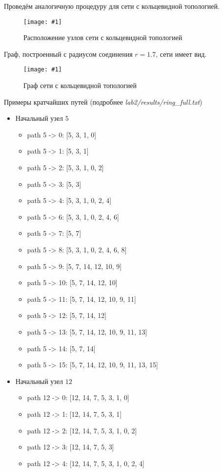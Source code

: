 \documentclass[a4paper,12pt]{article}
\newcommand{\plot}[3]{
    \begin{figure}[H]
        \begin{center}
            \texttt{[image: \#1]}
            \caption{#2}
            \label{#3}
        \end{center}
    \end{figure}
}
\begin{document}
    Проведём аналогичную процедуру для сети с кольцевидной топологией.
    \plot{full_ring_points}{Расположение узлов сети с кольцевидной топологией}{p:fullRingPoints}

    Граф, построенный с радиусом соединения $ r = 1.7 $, сети имеет вид.
    \plot{full_ring}{Граф сети с кольцевидной топологией}{p:fullRing}

    Примеры кратчайших путей (подробнее \textsl{lab2/results/ring\_full.txt})
    \begin{itemize}
        \item Начальный узел $ 5 $
        \begin{itemize}
            \item path 5 -> 0: [5, 3, 1, 0]
            \item path 5 -> 1: [5, 3, 1]
            \item path 5 -> 2: [5, 3, 1, 0, 2]
            \item path 5 -> 3: [5, 3]
            \item path 5 -> 4: [5, 3, 1, 0, 2, 4]
            \item path 5 -> 6: [5, 3, 1, 0, 2, 4, 6]
            \item path 5 -> 7: [5, 7]
            \item path 5 -> 8: [5, 3, 1, 0, 2, 4, 6, 8]
            \item path 5 -> 9: [5, 7, 14, 12, 10, 9]
            \item path 5 -> 10: [5, 7, 14, 12, 10]
            \item path 5 -> 11: [5, 7, 14, 12, 10, 9, 11]
            \item path 5 -> 12: [5, 7, 14, 12]
            \item path 5 -> 13: [5, 7, 14, 12, 10, 9, 11, 13]
            \item path 5 -> 14: [5, 7, 14]
            \item path 5 -> 15: [5, 7, 14, 12, 10, 9, 11, 13, 15]
        \end{itemize}
        \item Начальный узел $ 12 $
        \begin{itemize}
            \item path 12 -> 0: [12, 14, 7, 5, 3, 1, 0]
            \item path 12 -> 1: [12, 14, 7, 5, 3, 1]
            \item path 12 -> 2: [12, 14, 7, 5, 3, 1, 0, 2]
            \item path 12 -> 3: [12, 14, 7, 5, 3]
            \item path 12 -> 4: [12, 14, 7, 5, 3, 1, 0, 2, 4]

\end{itemize}
\end{itemize}
\end{document}
